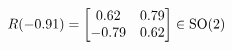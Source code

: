 \documentclass[preview]{standalone}
\begin{document}
\begin{align*}
\special{dvisvgm:raw <g id='unique000'>}R(-0.91) = \begin{bmatrix} 0.62 & 0.79 \\ -0.79 & 0.62 \end{bmatrix} \in \text{SO}(2)\special{dvisvgm:raw </g>}
\end{align*}
\end{document}
